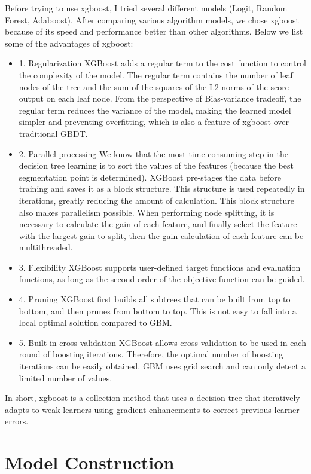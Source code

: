 \documentclass[fleqn,10pt]{wlscirep}
\begin{document}
Before trying to use xgboost, I tried several different models (Logit, Random Forest, Adaboost). After comparing various algorithm models, we chose xgboost because of its speed and performance better than other algorithms. Below we list some of the advantages of xgboost:
\begin{itemize}
\item 1. Regularization
XGBoost adds a regular term to the cost function to control the complexity of the model. The regular term contains the number of leaf nodes of the tree and the sum of the squares of the L2 norms of the score output on each leaf node. From the perspective of Bias-variance tradeoff, the regular term reduces the variance of the model, making the learned model simpler and preventing overfitting, which is also a feature of xgboost over traditional GBDT.
\item 2. Parallel processing
We know that the most time-consuming step in the decision tree learning is to sort the values ​​of the features (because the best segmentation point is determined). XGBoost pre-stages the data before training and saves it as a block structure. This structure is used repeatedly in iterations, greatly reducing the amount of calculation. This block structure also makes parallelism possible. When performing node splitting, it is necessary to calculate the gain of each feature, and finally select the feature with the largest gain to split, then the gain calculation of each feature can be multithreaded.
\item 3. Flexibility
XGBoost supports user-defined target functions and evaluation functions, as long as the second order of the objective function can be guided.
\item 4. Pruning
XGBoost first builds all subtrees that can be built from top to bottom, and then prunes from bottom to top. This is not easy to fall into a local optimal solution compared to GBM.
\item 5. Built-in cross-validation
XGBoost allows cross-validation to be used in each round of boosting iterations. Therefore, the optimal number of boosting iterations can be easily obtained. GBM uses grid search and can only detect a limited number of values.
\end{itemize}

In short, xgboost is a collection method that uses a decision tree that iteratively adapts to weak learners using gradient enhancements to correct previous learner errors.


\section*{Model Construction}
\end{document}
